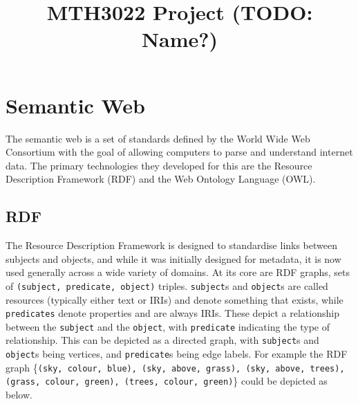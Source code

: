 \documentclass[english, 12pt]{article}
\title{MTH3022 Project (TODO: Name?)}
\author{196722 \and } %
\date{}
\begin{document}
\maketitle

\section{Semantic Web}
The semantic web is a set of standards defined by the World Wide Web Consortium\cite{w3c_website} with the goal of allowing computers to parse and understand internet data. The primary technologies they developed for this are the Resource Description Framework\cite{w3c_rdf} (RDF) and the Web Ontology Language\cite{w3c_owl} (OWL).

\subsection{RDF}
The Resource Description Framework is designed to standardise links between subjects and objects, and while it was initially designed for metadata, it is now used generally across a wide variety of domains. At its core are RDF graphs, sets of \texttt{(subject, predicate, object)} triples. \texttt{subject}s and \texttt{object}s are called resources (typically either text or IRIs\cite{iri_rfc}) and denote something that exists, while \texttt{predicates} denote properties and are always IRIs. These depict a relationship between the \texttt{subject} and the \texttt{object}, with \texttt{predicate} indicating the type of relationship. This can be depicted as a directed graph, with \texttt{subject}s and \texttt{object}s being vertices, and \texttt{predicate}s being edge labels. For example the RDF graph \{\texttt{(sky, colour, blue), (sky, above, grass), (sky, above, trees), (grass, colour, green), (trees, colour, green)}\} could be depicted as below.
\begin{figure}[H]
\centering
{}
\end{figure}
\end{document}
